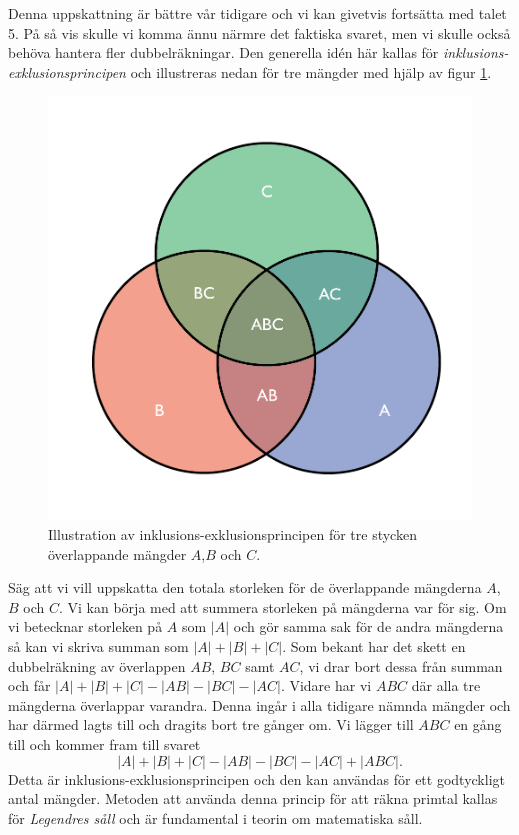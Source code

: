 Denna uppskattning är bättre vår tidigare och vi kan givetvis fortsätta med talet 5.
På så vis skulle vi komma ännu närmre det faktiska svaret, 
men vi skulle också behöva hantera fler dubbelräkningar.
Den generella idén här kallas för \textit{inklusions-exklusionsprincipen} och illustreras nedan för tre mängder med hjälp av figur \ref{pop.fig}.
\begin{figure}[H]
    \centering
    \includegraphics[scale=0.3]{erik/Images/Venndiagram.pdf}
    \caption{Illustration av inklusions-exklusionsprincipen för tre stycken överlappande mängder $A$,$B$ och $C$.}
    \label{pop.fig}
\end{figure}
Säg att vi vill uppskatta den totala storleken för de överlappande mängderna $A$, $B$ och $C$. 
Vi kan börja med att summera storleken på mängderna var för sig.
Om vi betecknar storleken på $A$ som $|A|$ och gör samma sak för de andra mängderna så kan vi skriva summan som $|A|+|B|+|C|$.
Som bekant har det skett en dubbelräkning av överlappen $AB$, $BC$ samt $AC$, vi drar bort dessa från summan och får $|A|+|B|+|C|-|AB|-|BC|-|AC|$.
Vidare har vi $ABC$ där alla tre mängderna överlappar varandra.
Denna ingår i alla tidigare nämnda mängder och har därmed lagts till och dragits bort tre gånger om. 
Vi lägger till $ABC$ en gång till och kommer fram till svaret
\begin{equation*}
    |A|+|B|+|C|-|AB|-|BC|-|AC|+|ABC|.
\end{equation*}
Detta är inklusions-exklusionsprincipen och den kan användas för ett godtyckligt antal mängder.
Metoden att använda denna princip för att räkna primtal kallas för \textit{Legendres såll} och är fundamental i teorin om matematiska såll.


